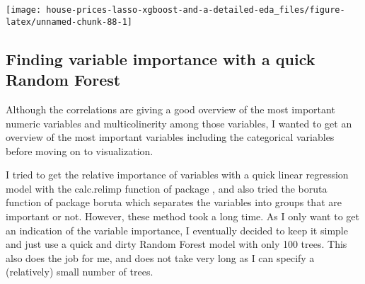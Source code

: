 \documentclass[]{article}
\begin{document}
\texttt{[image: house-prices-lasso-xgboost-and-a-detailed-eda\_files/figure-latex/unnamed-chunk-88-1]}

\subsection{Finding variable importance with a quick Random
Forest}\label{finding-variable-importance-with-a-quick-random-forest}

Although the correlations are giving a good overview of the most
important numeric variables and multicolinerity among those variables, I
wanted to get an overview of the most important variables including the
categorical variables before moving on to visualization.

I tried to get the relative importance of variables with a quick linear
regression model with the calc.relimp function of package , and also
tried the boruta function of package boruta which separates the
variables into groups that are important or not. However, these method
took a long time. As I only want to get an indication of the variable
importance, I eventually decided to keep it simple and just use a quick
and dirty Random Forest model with only 100 trees. This also does the
job for me, and does not take very long as I can specify a (relatively)
small number of trees.
\end{document}
